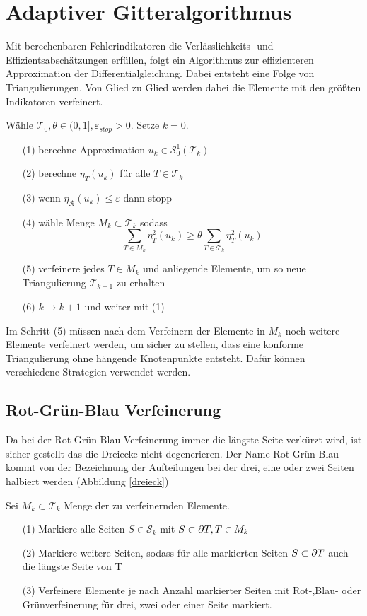 \chapter{Adaptiver Gitteralgorithmus}
Mit berechenbaren Fehlerindikatoren die Verlässlichkeits- und Effizientsabschätzungen erfüllen, folgt ein Algorithmus zur effizienteren Approximation der Differentialgleichung. Dabei entsteht eine Folge von Triangulierungen. Von Glied zu Glied werden dabei die Elemente mit den größten Indikatoren verfeinert.
\begin{algorithmus}
	Wähle $\mathscr{T}_0, \theta\in (0,1],\varepsilon_{stop}>0$. Setze $k=0$.
	\begin{itemize}
		\item[(1)] berechne Approximation $u_k\in\mathscr{S}_0^1(\mathscr{T}_k)$
		\item[(2)] berechne $\eta_T(u_k)$ für alle $T\in\mathscr{T}_k$
		\item[(3)] wenn $\eta_{\mathscr{R}}(u_k) \leq \varepsilon$ dann stopp
		\item[(4)] wähle Menge $M_k\subset\mathscr{T}_k$ sodass
		\[ \sum_{T\in M_k} \eta_T^2(u_k) \geq \theta\sum_{T\in\mathscr{T}_k}\eta_T^2(u_k)\]
		\item[(5)] verfeinere jedes $T\in M_k$ und anliegende Elemente, um so neue Triangulierung $\mathscr{T}_{k+1}$ zu erhalten
		\item[(6)] $k \rightarrow k + 1$ und weiter mit (1)
	\end{itemize}
\end{algorithmus}
Im Schritt (5) müssen nach dem Verfeinern der Elemente in $M_k$ noch weitere Elemente verfeinert werden, um sicher zu stellen, dass eine konforme Triangulierung ohne hängende Knotenpunkte entsteht. Dafür können verschiedene Strategien verwendet werden.
\section{Rot-Grün-Blau Verfeinerung}
Da bei der Rot-Grün-Blau Verfeinerung immer die längste Seite verkürzt wird, ist sicher gestellt das die Dreiecke nicht degenerieren. Der Name Rot-Grün-Blau kommt von der Bezeichnung der Aufteilungen bei der drei, eine oder zwei Seiten halbiert werden (Abbildung \ref{dreieck})
\begin{algorithmus}
    Sei $M_k\subset \mathscr{T}_k$ Menge der zu verfeinernden Elemente.
	\begin{itemize}
		\item[(1)] Markiere alle Seiten $S \in \mathscr{S}_k$ mit $S \subset \partial T, T\in M_k$
		\item[(2)] Markiere weitere Seiten, sodass für alle markierten Seiten $S\subset \partial T$  auch die längste Seite von T
		\item[(3)] Verfeinere Elemente je nach Anzahl markierter Seiten mit  Rot-,Blau- oder Grünverfeinerung für drei, zwei oder einer Seite markiert.
	\end{itemize}
\end{algorithmus} 

